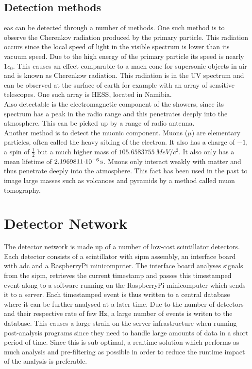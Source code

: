 \documentclass[abstract,toc,los,english,11pt,glossaries]{jluthesis}
\begin{document}
\subsection{Detection methods}
\acrshort{eas} can be detected through a number of methods. One such method is to observe the Cherenkov radiation produced by the primary particle. This radiation occurs since the local speed of light in the visible spectrum is lower than its vacuum speed. Due to the high energy of the primary particle its speed is nearly $1c_0$. This causes an effect comparable to a mach cone for supersonic objects in air and is known as Cherenkow radiation. This radiation is in the UV spectrum and can be observed at the surface of earth for example with an array of sensitive telescopes. One such array is HESS, located in Namibia. \\
Also detectable is the electromagnetic component of the showers, since its spectrum has a peak in the radio range and this penetrates deeply into the atmosphere. This can be picked up by a range of radio antenna. \\
Another method is to detect the muonic component. Muons ($\mu$) are elementary particles, often called the heavy sibling of the electron. It also has a charge of $-1$, a spin of $\frac{1}{2}$ but a much higher mass of
$105.6583755\,\si{MeV/c^2}$. It also only has a mean lifetime of $\snsi{2.1969811}{-6}{s}$. Muons only interact weakly with matter and thus penetrate deeply into the atmosphere. This fact has been used in the past to image large masses such as volcanoes and pyramids by a method called muon tomography.

\section{Detector Network}
The detector network is made up of a number of low-cost scintillator detectors. Each detector consists of a scintillator with \acrfull{sipm} assembly, an interface board with \acrfull{adc} and a RaspberryPi minicomputer. The interface board analyses signals from the \acrshort{sipm}, retrieves the current timestamp and passes this timestamped event along to a software running on the RaspberryPi minicomputer which sends it to a server. Each timestamped event is thus written to a central database where it can be further analysed at a later time. Due to the number of detectors and their respective rate of few Hz, a large number of events is writen to the database. This causes a large strain on the server infrastructure when running post-analysis programs since they need to handle large amounts of data in a short period of time. Since this is sub-optimal, a realtime solution which performs as much analysis and pre-filtering as possible in order to reduce the runtime impact of the analysis is preferable.
\end{document}
